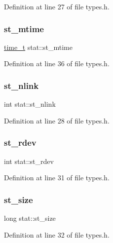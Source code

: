 Definition at line 27 of file types.\+h.

\mbox{\label{structstat_a77e235090f8cb6897f1c0ce65689006b}} 
\subsubsection{\texorpdfstring{st\_mtime}{st\_mtime}}
{\footnotesize\ttfamily \mbox{\hyperlink{time_8h_aec517130c026730881898750d76e596f}{time\+\_\+t}} stat\+::st\+\_\+mtime}



Definition at line 36 of file types.\+h.

\mbox{\label{structstat_a764f30814326ac3ecb061b35d812f5f4}} 
\subsubsection{\texorpdfstring{st\_nlink}{st\_nlink}}
{\footnotesize\ttfamily int stat\+::st\+\_\+nlink}



Definition at line 28 of file types.\+h.

\mbox{\label{structstat_a236f1eed46fc5eecf87ef22318ae8422}} 
\subsubsection{\texorpdfstring{st\_rdev}{st\_rdev}}
{\footnotesize\ttfamily int stat\+::st\+\_\+rdev}



Definition at line 31 of file types.\+h.

\mbox{\label{structstat_a66969473ec3e1e4b6cdfb655b93a1dee}} 
\subsubsection{\texorpdfstring{st\_size}{st\_size}}
{\footnotesize\ttfamily long stat\+::st\+\_\+size}



Definition at line 32 of file types.\+h.

